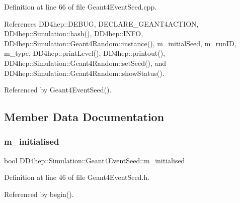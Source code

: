 Definition at line 66 of file Geant4\+Event\+Seed.\+cpp.



References D\+D4hep\+::\+D\+E\+B\+UG, D\+E\+C\+L\+A\+R\+E\+\_\+\+G\+E\+A\+N\+T4\+A\+C\+T\+I\+ON, D\+D4hep\+::\+Simulation\+::hash(), D\+D4hep\+::\+I\+N\+FO, D\+D4hep\+::\+Simulation\+::\+Geant4\+Random\+::instance(), m\+\_\+initial\+Seed, m\+\_\+run\+ID, m\+\_\+type, D\+D4hep\+::print\+Level(), D\+D4hep\+::printout(), D\+D4hep\+::\+Simulation\+::\+Geant4\+Random\+::set\+Seed(), and D\+D4hep\+::\+Simulation\+::\+Geant4\+Random\+::show\+Status().



Referenced by Geant4\+Event\+Seed().



\subsection{Member Data Documentation}
\hypertarget{class_d_d4hep_1_1_simulation_1_1_geant4_event_seed_a8fa0790e30cdbac4a172af5ff0fd7cc7}{}\label{class_d_d4hep_1_1_simulation_1_1_geant4_event_seed_a8fa0790e30cdbac4a172af5ff0fd7cc7} 
\subsubsection{\texorpdfstring{m\+\_\+initialised}{m\_initialised}}
{\footnotesize\ttfamily bool D\+D4hep\+::\+Simulation\+::\+Geant4\+Event\+Seed\+::m\+\_\+initialised\hspace{0.3cm}{\ttfamily [protected]}}



Definition at line 46 of file Geant4\+Event\+Seed.\+h.



Referenced by begin().

\hypertarget{class_d_d4hep_1_1_simulation_1_1_geant4_event_seed_aad2e0264889e33271d97832966d516b0}{}\label{class_d_d4hep_1_1_simulation_1_1_geant4_event_seed_aad2e0264889e33271d97832966d516b0} 
